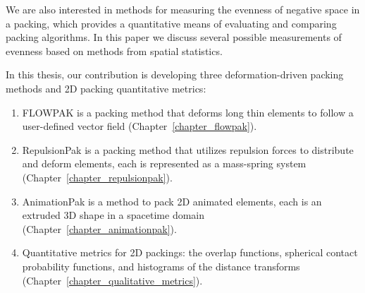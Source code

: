We are also interested in methods for measuring the evenness of negative space
in a packing, which provides a quantitative means of evaluating
and comparing packing algorithms.  In this paper we discuss
several possible measurements of evenness based on methods from
spatial statistics.

In this thesis, our contribution is developing three deformation-driven packing methods and 2D packing quantitative metrics:
\begin{enumerate}
\item FLOWPAK is a packing method that deforms long thin elements to follow a user-defined vector field (Chapter~\ref{chapter_flowpak}).
\item RepulsionPak is a packing method that utilizes repulsion forces to distribute and deform elements,
	each is represented as a mass-spring system (Chapter~\ref{chapter_repulsionpak}).
\item AnimationPak is a method to pack 2D animated elements, each is an extruded 3D shape
	in a spacetime domain (Chapter~\ref{chapter_animationpak}). 
\item  Quantitative metrics for 2D packings: the overlap functions, spherical contact probability functions,
and histograms of the distance transforms (Chapter~\ref{chapter_qualitative_metrics}). 
\end{enumerate}






